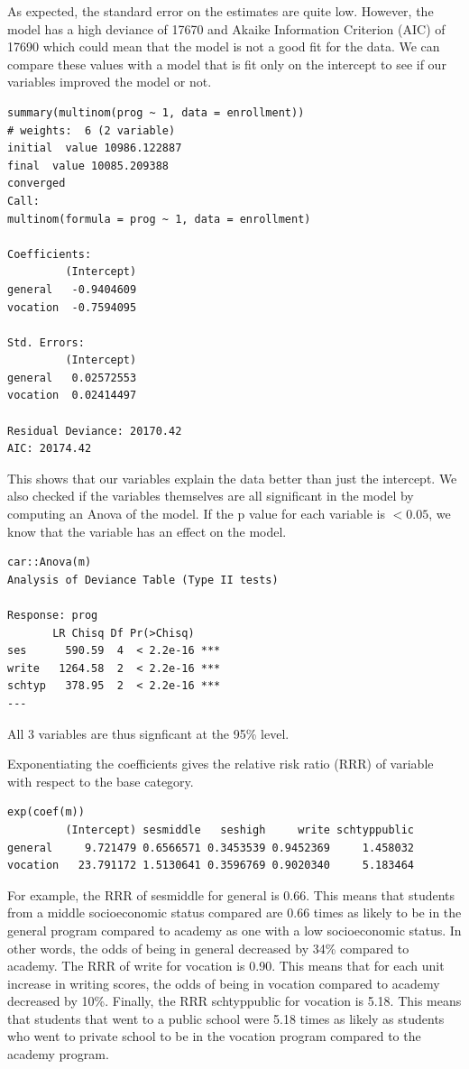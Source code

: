 \documentclass[12pt]{article}
\begin{document}
As expected, the standard error on the estimates are quite low. However, the model has a high deviance of 17670 and Akaike Information Criterion (AIC) of 17690 which could mean that the model is not a good fit for the data. We can compare these values with a model that is fit only on the intercept to see if our variables improved the model or not. 

\begin{Verbatim}[fontsize=\small]
summary(multinom(prog ~ 1, data = enrollment))
# weights:  6 (2 variable)
initial  value 10986.122887 
final  value 10085.209388 
converged
Call:
multinom(formula = prog ~ 1, data = enrollment)

Coefficients:
         (Intercept)
general   -0.9404609
vocation  -0.7594095

Std. Errors:
         (Intercept)
general   0.02572553
vocation  0.02414497

Residual Deviance: 20170.42 
AIC: 20174.42 
\end{Verbatim}

This shows that our variables explain the data better than just the intercept. We also checked if the variables themselves are all significant in the model by computing an Anova of the model. If the p value for each variable is $<0.05$, we know that the variable has an effect on the model. 
\begin{Verbatim}[fontsize=\small] 
car::Anova(m)
Analysis of Deviance Table (Type II tests)

Response: prog
       LR Chisq Df Pr(>Chisq)    
ses      590.59  4  < 2.2e-16 ***
write   1264.58  2  < 2.2e-16 ***
schtyp   378.95  2  < 2.2e-16 ***
---
\end{Verbatim}

All 3 variables are thus signficant at the 95\% level. 

Exponentiating the coefficients gives the relative risk ratio (RRR) of variable with respect to the base category.

\begin{Verbatim}[fontsize=\small]
exp(coef(m))
         (Intercept) sesmiddle   seshigh     write schtyppublic
general     9.721479 0.6566571 0.3453539 0.9452369     1.458032
vocation   23.791172 1.5130641 0.3596769 0.9020340     5.183464
\end{Verbatim}

For example, the RRR of sesmiddle for general is 0.66. This means that students from a middle socioeconomic status compared are 0.66 times as likely to be in the general program compared to academy as one with a low socioeconomic status. In other words, the odds of being in general decreased by 34\% compared to academy. The RRR of write for vocation is 0.90. This means that for each unit increase in writing scores, the odds of being in vocation compared to academy decreased by 10\%. Finally, the RRR schtyppublic for vocation is 5.18. This means that students that went to a public school were 5.18 times as likely as students who went to private school to be in the vocation program compared to the academy program. 
\end{document}
